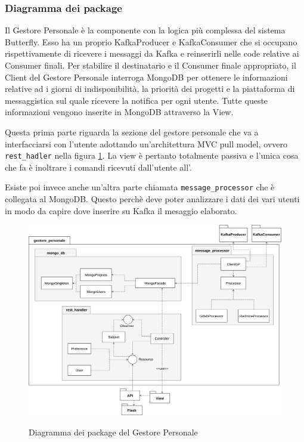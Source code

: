 \subsubsection{Diagramma dei package}
Il Gestore Personale è la componente con la logica più complessa del sistema Butterfly. Esso ha un proprio KafkaProducer e KafkaConsumer
che si occupano rispettivamente di ricevere i messaggi da Kafka e reinserirli nelle code relative ai Consumer finali. Per stabilire il destinatario e il Consumer finale appropriato, il Client del Gestore Personale interroga MongoDB per ottenere le informazioni relative ad i giorni di indisponibilità, la priorità dei progetti e la piattaforma di messaggistica sul quale ricevere la notifica per ogni utente.
Tutte queste informazioni vengono inserite in MongoDB attraverso la View. \par
Questa prima parte riguarda la sezione del gestore personale che va a interfacciarsi con l’utente adottando un’architettura MVC pull model, ovvero \texttt{rest\_hadler} nella figura \ref{GP-Package}.
La view è pertanto totalmente passiva e l’unica cosa che fa è inoltrare i comandi ricevuti dall’utente all’. \par
Esiste poi invece anche un'altra parte chiamata \texttt{message\_processor} che è collegata al MongoDB.
Questo perchè deve poter analizzare i dati dei vari utenti in modo da capire dove inserire su Kafka il mesaggio elaborato.

\begin{figure}[H]
    \centering
    \includegraphics[width=\textwidth]{img/Package-GestorePersonale.png}\\
    \caption{Diagramma dei package del Gestore Personale}
    \label{GP-Package}
\end{figure}

